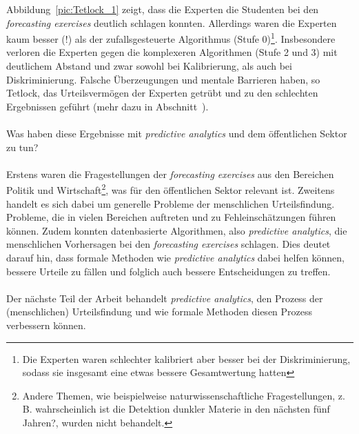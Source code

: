 Abbildung~\ref{pic:Tetlock_1} zeigt, dass die Experten die Studenten bei
den \emph{forecasting exercises} deutlich schlagen konnten. Allerdings waren die
Experten kaum besser (!) als der zufallsgesteuerte Algorithmus 
(Stufe 0)\footnote{Die Experten waren schlechter kalibriert aber besser bei
der Diskriminierung, sodass sie insgesamt eine etwas bessere Gesamtwertung
hatten}. Insbesondere verloren die Experten gegen die komplexeren Algorithmen
(Stufe 2 und 3) mit deutlichem Abstand und zwar sowohl bei Kalibrierung, als
auch bei Diskriminierung. Falsche Überzeugungen und mentale Barrieren haben, so
Tetlock, das Urteilsvermögen der Experten getrübt und zu den schlechten
Ergebnissen geführt (mehr dazu in Abschnitt~\xcom). \\ \\
Was haben diese Ergebnisse mit \emph{predictive analytics} und dem öffentlichen
Sektor zu tun?\\ \\
Erstens waren die Fragestellungen der \emph{forecasting exercises} aus den
Bereichen Politik und Wirtschaft\footnote{
Andere Themen, wie beispielweise naturwissenschaftliche Fragestellungen,
z. B.  wahrscheinlich ist die Detektion dunkler Materie
in den nächsten fünf Jahren?\grqq, wurden nicht behandelt.
}, was für den öffentlichen Sektor relevant ist. Zweitens handelt es sich dabei
um generelle Probleme der menschlichen Urteilsfindung. Probleme, die in vielen
Bereichen auftreten und zu Fehleinschätzungen führen können. Zudem
konnten datenbasierte Algorithmen, also \emph{predictive analytics}, die
menschlichen Vorhersagen bei den \emph{forecasting exercises} schlagen. Dies
deutet darauf hin, dass formale Methoden wie \emph{predictive analytics} dabei
helfen können, bessere Urteile zu fällen und folglich auch bessere
Entscheidungen zu treffen. \\ \\
Der nächste Teil der Arbeit behandelt \emph{predictive analytics},
den Prozess der (menschlichen) Urteilsfindung und wie formale Methoden diesen
Prozess verbessern können.
